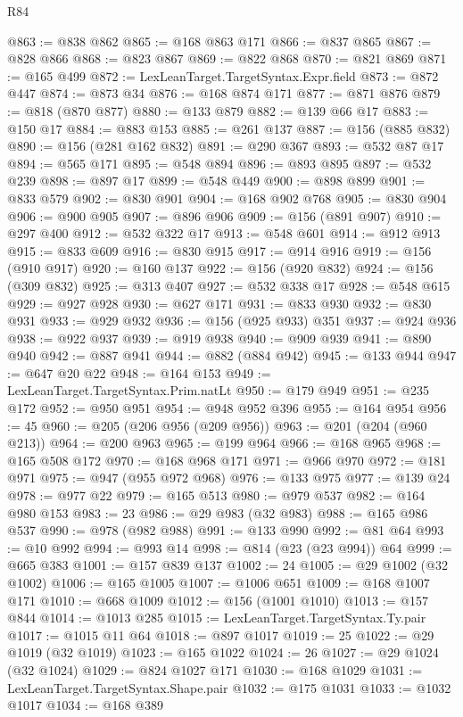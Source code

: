 \begin{lexlean}{R84}
\begin{coremodule}
@863 := @838 @862
@865 := @168 @863 @171
@866 := @837 @865
@867 := @828 @866
@868 := @823 @867
@869 := @822 @868
@870 := @821 @869
@871 := @165 @499
@872 := LexLeanTarget.TargetSyntax.Expr.field
@873 := @872 @447
@874 := @873 @34
@876 := @168 @874 @171
@877 := @871 @876
@879 := @818 (@870 @877)
@880 := @133 @879
@882 := @139 @66 @17
@883 := @150 @17
@884 := @883 @153
@885 := @261 @137
@887 := @156 (@885 @832)
@890 := @156 (@281 @162 @832)
@891 := @290 @367
@893 := @532 @87 @17
@894 := @565 @171
@895 := @548 @894
@896 := @893 @895
@897 := @532 @239
@898 := @897 @17
@899 := @548 @449
@900 := @898 @899
@901 := @833 @579
@902 := @830 @901
@904 := @168 @902 @768
@905 := @830 @904
@906 := @900 @905
@907 := @896 @906
@909 := @156 (@891 @907)
@910 := @297 @400
@912 := @532 @322 @17
@913 := @548 @601
@914 := @912 @913
@915 := @833 @609
@916 := @830 @915
@917 := @914 @916
@919 := @156 (@910 @917)
@920 := @160 @137
@922 := @156 (@920 @832)
@924 := @156 (@309 @832)
@925 := @313 @407
@927 := @532 @338 @17
@928 := @548 @615
@929 := @927 @928
@930 := @627 @171
@931 := @833 @930
@932 := @830 @931
@933 := @929 @932
@936 := @156 (@925 @933) @351
@937 := @924 @936
@938 := @922 @937
@939 := @919 @938
@940 := @909 @939
@941 := @890 @940
@942 := @887 @941
@944 := @882 (@884 @942)
@945 := @133 @944
@947 := @647 @20 @22
@948 := @164 @153
@949 := LexLeanTarget.TargetSyntax.Prim.natLt
@950 := @179 @949
@951 := @235 @172
@952 := @950 @951
@954 := @948 @952 @396
@955 := @164 @954
@956 := 45
@960 := @205 (@206 @956 (@209 @956))
@963 := @201 (@204 (@960 @213))
@964 := @200 @963
@965 := @199 @964
@966 := @168 @965
@968 := @165 @508 @172
@970 := @168 @968 @171
@971 := @966 @970
@972 := @181 @971
@975 := @947 (@955 @972 @968)
@976 := @133 @975
@977 := @139 @24
@978 := @977 @22
@979 := @165 @513
@980 := @979 @537
@982 := @164 @980 @153
@983 := 23
@986 := @29 @983 (@32 @983)
@988 := @165 @986 @537
@990 := @978 (@982 @988)
@991 := @133 @990
@992 := @81 @64
@993 := @10 @992
@994 := @993 @14
@998 := @814 (@23 (@23 @994)) @64
@999 := @665 @383
@1001 := @157 @839 @137
@1002 := 24
@1005 := @29 @1002 (@32 @1002)
@1006 := @165 @1005
@1007 := @1006 @651
@1009 := @168 @1007 @171
@1010 := @668 @1009
@1012 := @156 (@1001 @1010)
@1013 := @157 @844
@1014 := @1013 @285
@1015 := LexLeanTarget.TargetSyntax.Ty.pair
@1017 := @1015 @11 @64
@1018 := @897 @1017
@1019 := 25
@1022 := @29 @1019 (@32 @1019)
@1023 := @165 @1022
@1024 := 26
@1027 := @29 @1024 (@32 @1024)
@1029 := @824 @1027 @171
@1030 := @168 @1029
@1031 := LexLeanTarget.TargetSyntax.Shape.pair
@1032 := @175 @1031
@1033 := @1032 @1017
@1034 := @168 @389

\end{coremodule}
\end{lexlean}
